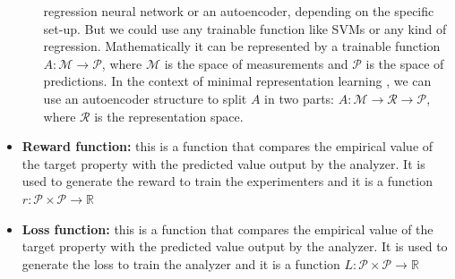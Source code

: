 \documentclass[11pt,a4paper,twoside]{report}
\newcommand{\+}{\textnormal{+} }
\theoremstyle{definition}
\numberwithin{equation}{chapter}
\begin{document}
\begin{itemize}
\begin{itemize}
        regression neural network or an autoencoder, depending on the specific
        set-up. But we could use any trainable function like SVMs or any kind of
        regression. Mathematically it can be represented by a trainable function
        $ A :\mathcal{M} \rightarrow \mathcal{P}$, where $\mathcal{M}$ is the
        space of measurements and $\mathcal{P}$ is the space of predictions. In
        the context of minimal representation learning
        \cite{iten2020discovering}, we can use an autoencoder structure to split
        $A$ in two parts: $A:\mathcal{M} \rightarrow \mathcal{R}\rightarrow
        \mathcal{P}$, where $\mathcal{R}$ is the representation space.
  \end{itemize}
    \item \textbf{Reward function:} this is a function that compares the
    empirical value of the target property with the predicted value output by
    the analyzer. It is used to generate the reward to train the
    experimenters and it is a function
    $r:\mathcal{P}\times\mathcal{P}\rightarrow\mathbb{R}$  
    \item \textbf{Loss function:} this is a function that compares the empirical
    value of the target property with the predicted value output by the
    analyzer. It is used to generate the loss to train the analyzer and it is a
    function $L:\mathcal{P}\times\mathcal{P}\rightarrow\mathbb{R}$  
\end{itemize}
\end{document}
